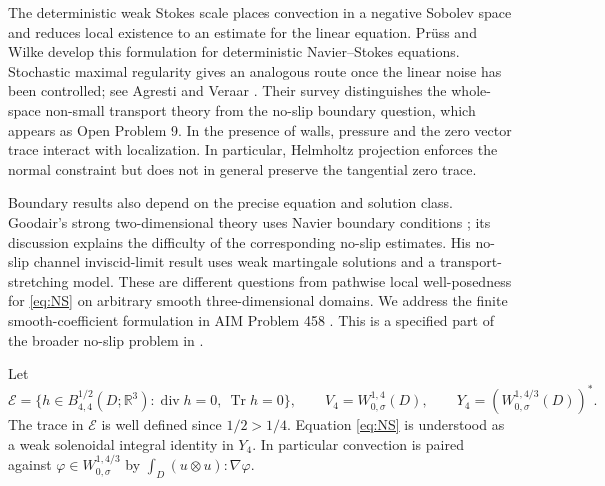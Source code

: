 \documentclass[11pt]{article}
\numberwithin{equation}{section}
\theoremstyle{remark}
\newcommand{\R}{\mathbb R}
\newcommand{\Tr}{\operatorname{Tr}}
\newcommand{\divg}{\operatorname{div}}
\newcommand{\calE}{\mathcal E}
\begin{document}
The deterministic weak Stokes scale places convection in a negative
Sobolev space and reduces local existence to an estimate for the
linear equation. Pr\"uss and Wilke \cite[Section 5]{PW} develop this
formulation for deterministic Navier--Stokes equations. Stochastic
maximal regularity gives an analogous route once the linear noise
has been controlled; see Agresti and Veraar \cite{AV}. Their survey
distinguishes the whole-space non-small transport theory from the
no-slip boundary question, which appears as Open Problem 9. In the
presence of walls, pressure and the zero vector trace interact with
localization. In particular, Helmholtz projection enforces the normal
constraint but does not in general preserve the tangential zero trace.

Boundary results also depend on the precise equation and solution
class. Goodair's strong two-dimensional theory uses Navier boundary
conditions \cite{GoodairNavier}; its discussion explains the difficulty
of the corresponding no-slip estimates. His no-slip channel
inviscid-limit result \cite{GoodairPlates} uses weak martingale
solutions and a transport-stretching model. These are different
questions from pathwise local well-posedness for \eqref{eq:NS} on
arbitrary smooth three-dimensional domains. We address the finite
smooth-coefficient formulation in AIM Problem 458 \cite{AIM458}.
This is a specified part of the broader no-slip problem in \cite{AV}.

Let
\[
 \calE=\{h\in B^{1/2}_{4,4}(D;\R^3):\divg h=0,\ \Tr h=0\},
 \qquad V_4=W^{1,4}_{0,\sigma}(D),\qquad
 Y_4=(W^{1,4/3}_{0,\sigma}(D))^*.
\]
The trace in $\calE$ is well defined since $1/2>1/4$.
Equation \eqref{eq:NS} is understood as a weak solenoidal integral
identity in $Y_4$. In particular convection is paired against
$\varphi\in W^{1,4/3}_{0,\sigma}$ by
$\int_D(u\otimes u):\nabla\varphi$.
\end{document}
